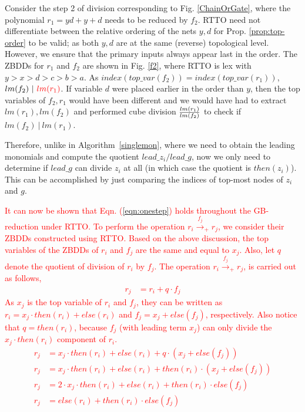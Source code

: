 \begin{Example}
\label{exm:pi_rtto}
Consider the step 2 of division corresponding to
 Fig. \ref{ChainOrGate}, where the polynomial $r_1 = yd +y+d$ needs to
 be reduced by $f_2$. RTTO need not differentiate between the
relative ordering of the nets $y, d$ for Prop. \ref{prop:top-order} to
be valid; as both $y, d$ are at the same (reverse) topological
level. However, we ensure that the primary inputs always appear last
in the order. The ZBDDs for $r_1$ and $f_2$ are shown in
Fig. \ref{f2}, where RTTO is lex with $y > x > d > c > b> a$.  As
$index(top\_var(f_2)) = index(top\_var(r_1))$,  $lm(f_2) ~|~ \textcolor{red}{lm(r_1)}$.
If variable $d$ were placed earlier in the order than $y$, then the
top variables of $f_2, r_1$ 
would have been different and we would have had to extract
$lm(r_1),lm(f_2)$ and performed cube division
${lm(r_1)}\over{lm(f_2)}$ to check if $lm(f_2) ~|~ lm(r_1)$. 
\end{Example}



Therefore, unlike in Algorithm~\ref{singlemon}, where we need to
obtain the leading monomials and compute the quotient
$lead\_z_i/lead\_g$, now we only need to determine if
$lead\_g$ can divide $z_i$ at all (in which case the quotient is
$then(z_i)$). This can be accomplished by just comparing the indices
of top-most nodes of $z_i$ and $g$. 

\par \textcolor{red}{It can now be shown that Eqn. (\ref{eqn:onestep})
holds throughout the GB-reduction under RTTO. To perform the operation
$r_i\xrightarrow{f_j}_+ r_j$, we consider their ZBDDs constructed
using RTTO. Based on the above discussion, the top variables of the
ZBDDs of $r_i$ and $f_j$ are the same and equal to $x_j$. Also, let $q$
denote the quotient of division of $r_i$ by $f_j$. The operation $r_i
\xrightarrow{f_j}_+ r_j$, is carried out as follows, 
\begin{align*}
r_j &= r_i + q\cdot f_j  
\end{align*}
As $x_j$ is the top variable of $r_i$ and $f_j$, they can be written
as $r_i = x_j\cdot then(r_i) + else(r_i)$ and $f_j = x_j + else(f_j)$,
respectively. Also notice that $q = then(r_i)$, because $f_j$ (with
leading term $x_j$) can only divide the $x_j\cdot then(r_i)$ component
of $r_i$. 
\begin{align*}
r_j &= x_j\cdot then(r_i) + else(r_i) + q\cdot(x_j + else(f_j)) \\
r_j &= x_j\cdot then(r_i) + else(r_i) + then(r_i)\cdot(x_j + else(f_j)) \\
r_j &= 2\cdot x_j\cdot then(r_i) + else(r_i) + then(r_i)\cdot else(f_j) \\
r_j &= else(r_i) + then(r_i)\cdot else(f_j)
\end{align*}} 

